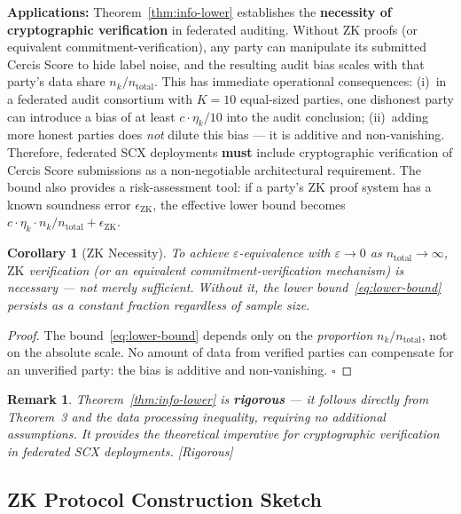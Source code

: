 \documentclass[12pt,a4paper]{article}
\newtheorem{corollary}[theorem]{Corollary}
\newtheorem{remark}[theorem]{Remark}
\newcommand{\rigorous}{\textcolor{green!50!black}{\small\textsf{[Rigorous]}}}
\newcommand{\ZK}{\mathrm{ZK}}
\begin{document}
\medskip\noindent
\textbf{Applications:}
Theorem~\ref{thm:info-lower} establishes the \textbf{necessity of cryptographic
verification} in federated auditing.  Without ZK proofs (or equivalent
commitment-verification), any party can manipulate its submitted Cercis Score
to hide label noise, and the resulting audit bias scales with that party's
data share $n_k/n_{\mathrm{total}}$.  This has immediate operational
consequences: (i)~in a federated audit consortium with $K=10$ equal-sized
parties, one dishonest party can introduce a bias of at least
$c\cdot\eta_k/10$ into the audit conclusion; (ii)~adding more honest parties
does \emph{not} dilute this bias — it is additive and non-vanishing.
Therefore, federated SCX deployments \textbf{must} include cryptographic
verification of Cercis Score submissions as a non-negotiable architectural
requirement.  The bound also provides a risk-assessment tool: if a party's ZK
proof system has a known soundness error $\epsilon_{\mathrm{ZK}}$, the
effective lower bound becomes $c\cdot\eta_k\cdot
n_k/n_{\mathrm{total}}+\epsilon_{\mathrm{ZK}}$.

\begin{corollary}[ZK Necessity]
\label{cor:zk-necessity}
To achieve $\varepsilon$-equivalence with $\varepsilon \to 0$ as
$n_{\mathrm{total}} \to \infty$, $\ZK$ verification (or an equivalent
commitment-verification mechanism) is \emph{necessary} — not merely
sufficient.  Without it, the lower bound~\eqref{eq:lower-bound} persists
as a constant fraction regardless of sample size.
\end{corollary}

\begin{proof}
The bound~\eqref{eq:lower-bound} depends only on the \emph{proportion}
$n_k / n_{\mathrm{total}}$, not on the absolute scale.  No amount of data
from verified parties can compensate for an unverified party: the bias is
additive and non-vanishing.  $\square$
\end{proof}

\begin{remark}
Theorem~\ref{thm:info-lower} is \textbf{rigorous} — it follows directly
from Theorem~3 and the data processing inequality, requiring no additional
assumptions.  It provides the theoretical imperative for cryptographic
verification in federated SCX deployments.  \rigorous
\end{remark}

\subsection{ZK Protocol Construction Sketch}
\end{document}
